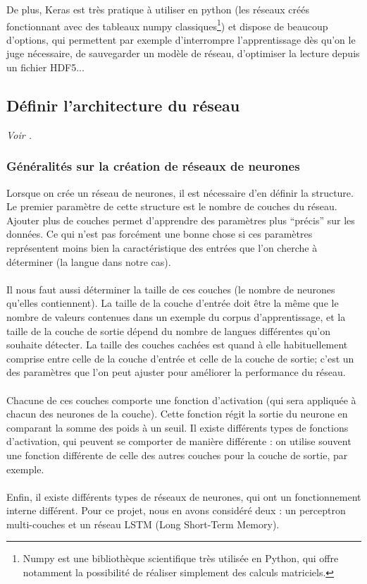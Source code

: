 \documentclass{article}
\begin{document}
De plus, Keras est très pratique à utiliser en python (les réseaux créés fonctionnant avec des tableaux numpy classiques\footnote{Numpy est une bibliothèque scientifique très utilisée en Python, qui offre notamment la possibilité de réaliser simplement des calculs matriciels.}) et dispose de beaucoup d'options, qui permettent par exemple d'interrompre l'apprentissage dès qu'on le juge nécessaire, de sauvegarder un modèle de réseau, d'optimiser la lecture depuis un fichier HDF5...

\subsection{Définir l'architecture du réseau}

\textit{Voir \cite{lecun2015}.}

\subsubsection{Généralités sur la création de réseaux de neurones}
Lorsque on crée un réseau de neurones, il est nécessaire d'en définir la structure. Le premier paramètre de cette structure est le nombre de couches du réseau. Ajouter plus de couches permet d'apprendre des paramètres plus ``précis'' sur les données. Ce qui n'est pas forcément une bonne chose si ces paramètres représentent moins bien la caractéristique des entrées que l'on cherche à déterminer (la langue dans notre cas).\\
 \\
Il nous faut aussi déterminer la taille de ces couches (le nombre de neurones qu'elles contiennent). La taille de la couche d'entrée doit être la même que le nombre de valeurs contenues dans un exemple du corpus d'apprentissage, et la taille de la couche de sortie dépend du nombre de langues différentes qu'on souhaite détecter. La taille des couches cachées est quand à elle habituellement comprise entre celle de la couche d'entrée et celle de la couche de sortie; c'est un des paramètres que l'on peut ajuster pour améliorer la performance du réseau.\\
 \\
Chacune de ces couches comporte une fonction d'activation (qui sera appliquée à chacun des neurones de la couche). Cette fonction régit la sortie du neurone en comparant la somme des poids à un seuil. Il existe différents types de fonctions d'activation, qui peuvent se comporter de manière différente : on utilise souvent une fonction différente de celle des autres couches pour la couche de sortie, par exemple.\\
 \\
Enfin, il existe différents types de réseaux de neurones, qui ont un fonctionnement interne différent.  Pour ce projet, nous en avons considéré deux : un perceptron multi-couches et un réseau LSTM (Long Short-Term Memory).
 
\end{document}

